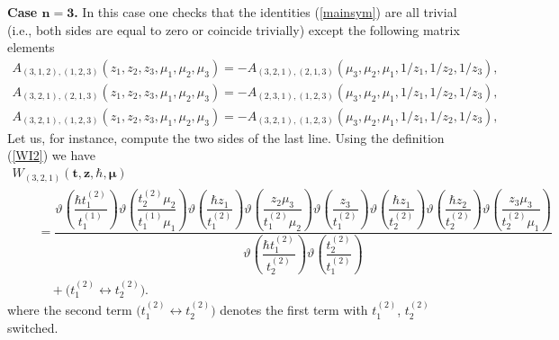 \documentclass[pdftex]{sigma}
\def\ttt{{\boldsymbol t}}
\def\zz{{\boldsymbol z}}
\def\mub{{\boldsymbol\mu}}
\let\thi\vartheta
\numberwithin{equation}{section}
\begin{document}
\textbf{Case $\boldsymbol{n=3}$.} In this case one checks that the identities (\ref{mainsym}) are all trivial (i.e., both sides are equal to zero or coincide trivially) except the following matrix elements
\begin{gather*}
A_{(3, 1, 2), (1, 2, 3)}(z_1,z_2,z_3,\mu_1,\mu_2,\mu_3) = - A_{(3, 2, 1), (2, 1, 3)}(\mu_3,\mu_2,\mu_1,1/z_1,1/z_2,1/z_3),\\
A_{(3, 2, 1), (2, 1, 3)}(z_1,z_2,z_3,\mu_1,\mu_2,\mu_3) = -A_{(2, 3, 1), (1, 2, 3)}(\mu_3,\mu_2,\mu_1,1/z_1,1/z_2,1/z_3),\\
A_{(3, 2, 1), (1, 2, 3)}(z_1,z_2,z_3,\mu_1,\mu_2,\mu_3) =- A_{(3, 2, 1), (1, 2, 3)}(\mu_3,\mu_2,\mu_1,1/z_1,1/z_2,1/z_3),
\end{gather*}
Let us, for instance, compute the two sides of the last line. Using the definition (\ref{WI2}) we have
\begin{gather*}
W_{(3, 2, 1)}(\ttt,\zz,\hbar,\mub)\\
\qquad{}= \dfrac{\thi\! \left( \dfrac {\hbar t_1^{(2)}}{t_1^{(1)}} \right) \thi\! \left( {
 \dfrac {t_2^{(2)} \mu_{{2}}}{t^{(1)}_1 \mu_{{1}}}} \right) \thi\! \left(
 {\dfrac {\hbar z_{{1}}}{t^{(2)}_1 }} \right) \thi\! \left( {\dfrac {z_{{2}} \mu
 _{{3}}}{t^{(2)}_1 \mu_{{2}}}} \right) \thi\! \left( {\dfrac {z_{{3}}}{t^{(2)}_1 }} \right) \thi\! \left( {\dfrac {\hbar z_{{1}}}{t^{(2)}_2 }} \right)
 \thi\! \left( {\dfrac {\hbar z_{{2}}}{t^{(2)}_2 }} \right) \thi\! \left( {
 \dfrac {z_{{3}}\mu_{{3}}}{t^{(2)}_2 \mu_{{1}}}} \right)
}{\thi\! \left( {\dfrac {\hbar t^{(2)}_1 }{t^{(2)}_2 }} \right) \thi\! \left( { \dfrac {t^{(2)}_2 }{t^{(2)}_1 }} \right)} \\
\qquad\quad{} + \big( t^{(2)}_1 \leftrightarrow t^{(2)}_2 \big).
\end{gather*}
where the second term $\big( t^{(2)}_1 \leftrightarrow t^{(2)}_2 \big)$ denotes the first term with $t^{(2)}_1$, $t^{(2)}_2$ switched.
\end{document}
